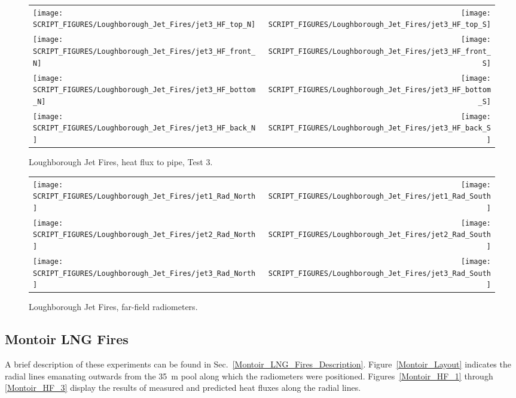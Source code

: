 \begin{figure}[p]
\begin{tabular*}{\textwidth}{l@{\extracolsep{\fill}}r}
\texttt{[image: SCRIPT\_FIGURES/Loughborough\_Jet\_Fires/jet3\_HF\_top\_N]} &
\texttt{[image: SCRIPT\_FIGURES/Loughborough\_Jet\_Fires/jet3\_HF\_top\_S]} \\
\texttt{[image: SCRIPT\_FIGURES/Loughborough\_Jet\_Fires/jet3\_HF\_front\_N]} &
\texttt{[image: SCRIPT\_FIGURES/Loughborough\_Jet\_Fires/jet3\_HF\_front\_S]} \\
\texttt{[image: SCRIPT\_FIGURES/Loughborough\_Jet\_Fires/jet3\_HF\_bottom\_N]} &
\texttt{[image: SCRIPT\_FIGURES/Loughborough\_Jet\_Fires/jet3\_HF\_bottom\_S]} \\
\texttt{[image: SCRIPT\_FIGURES/Loughborough\_Jet\_Fires/jet3\_HF\_back\_N]} &
\texttt{[image: SCRIPT\_FIGURES/Loughborough\_Jet\_Fires/jet3\_HF\_back\_S]} 
\end{tabular*}
\caption[Loughborough Jet Fires, heat flux to pipe, Test 3]{Loughborough Jet Fires, heat flux to pipe, Test 3.}
\label{Loughborough_3}
\end{figure}

\begin{figure}[p]
\begin{tabular*}{\textwidth}{l@{\extracolsep{\fill}}r}
\texttt{[image: SCRIPT\_FIGURES/Loughborough\_Jet\_Fires/jet1\_Rad\_North]} & 
\texttt{[image: SCRIPT\_FIGURES/Loughborough\_Jet\_Fires/jet1\_Rad\_South]} \\
\texttt{[image: SCRIPT\_FIGURES/Loughborough\_Jet\_Fires/jet2\_Rad\_North]} & 
\texttt{[image: SCRIPT\_FIGURES/Loughborough\_Jet\_Fires/jet2\_Rad\_South]} \\
\texttt{[image: SCRIPT\_FIGURES/Loughborough\_Jet\_Fires/jet3\_Rad\_North]} & 
\texttt{[image: SCRIPT\_FIGURES/Loughborough\_Jet\_Fires/jet3\_Rad\_South]} 
\end{tabular*}
\caption[Loughborough Jet Fires, far-field radiometers]{Loughborough Jet Fires, far-field radiometers.}
\label{Loughborough_Rad}
\end{figure}


\clearpage

\subsection{Montoir LNG Fires}
\label{Montoir_LNG_Fires_Heat_Flux}

A brief description of these experiments can be found in Sec.~\ref{Montoir_LNG_Fires_Description}. Figure~\ref{Montoir_Layout} indicates the radial lines emanating outwards from the 35~m pool along which the radiometers were positioned. Figures~\ref{Montoir_HF_1} through \ref{Montoir_HF_3} display the results of measured and predicted heat fluxes along the radial lines.

